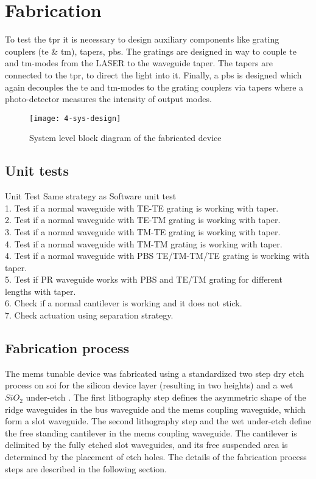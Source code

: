 \documentclass[../report.tex]{subfiles}
\begin{document}
	
	
\chapter{Fabrication}
To test the \gls{tpr} it is necessary to design auxiliary components like grating couplers (\gls{te} \& \gls{tm}), tapers, \gls{pbs}. The gratings are designed in way to couple \gls{te} and \gls{tm}-modes from the LASER to the waveguide taper. The tapers are connected to the \gls{tpr}, to direct the light into it. Finally, a \gls{pbs} is designed which again decouples the \gls{te} and \gls{tm}-modes to the grating couplers via tapers where a photo-detector measures the intensity of output modes.  

\begin{figure}[H] %
	\centering
	\texttt{[image: 4-sys-design]}
	\caption{System level block diagram of the fabricated device}
	\label{fig:4_sys_design}
\end{figure}

\section{Unit tests}
Unit Test
Same strategy as Software unit test\\
1. Test if a normal waveguide with TE-TE grating is working with taper.\\
2. Test if a normal waveguide with TE-TM grating is working with taper.\\
3. Test if a normal waveguide with TM-TE grating is working with taper.\\
4. Test if a normal waveguide with TM-TM grating is working with taper.\\
4. Test if a normal waveguide with PBS TE/TM-TM/TE grating is working with taper.\\
5. Test if PR waveguide works with PBS and TE/TM grating for different lengths with taper.\\
6. Check if a normal cantilever is working and it does not stick.\\
7. Check actuation using separation strategy.\\

\section{Fabrication process}\label{sec:fab_process}
The \gls{mems} tunable device was fabricated using a standardized two step dry etch process on \gls{soi} for the silicon device layer (resulting in two heights) and a wet $SiO_2$ under-etch \cite{errando-herranz_low-power_2015}. The first lithography step defines the asymmetric shape of the ridge waveguides in the bus waveguide and the \gls{mems} coupling waveguide, which form a slot waveguide. The second lithography step and the wet under-etch define the free standing cantilever in the \gls{mems} coupling waveguide. The cantilever is delimited by the fully etched slot waveguides, and its free suspended area is determined by the placement of etch holes. The details of the fabrication process steps are described in the following section.
\end{document}
